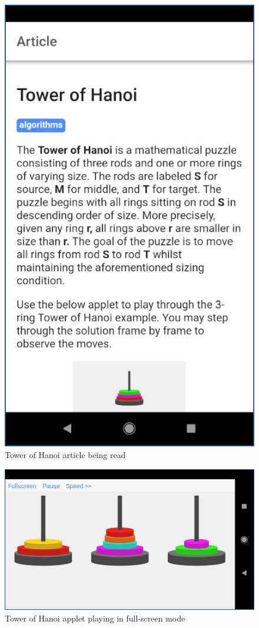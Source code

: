 \documentclass[12pt]{report}
\begin{document}
\begin{figure}
    \centering
    \includegraphics[scale=0.5]{images/avd-articles-tower.png}
    \caption{Tower of Hanoi article being read}
    \label{fig:avd-articles-tower}
\end{figure}

\begin{figure}
    \centering
    \includegraphics[scale=0.5]{images/avd-hanoi-fullscreen.png}
    \caption{Tower of Hanoi applet playing in full-screen mode}
    \label{fig:avd-hanoi-fullscreen}
\end{figure}
\end{document}
